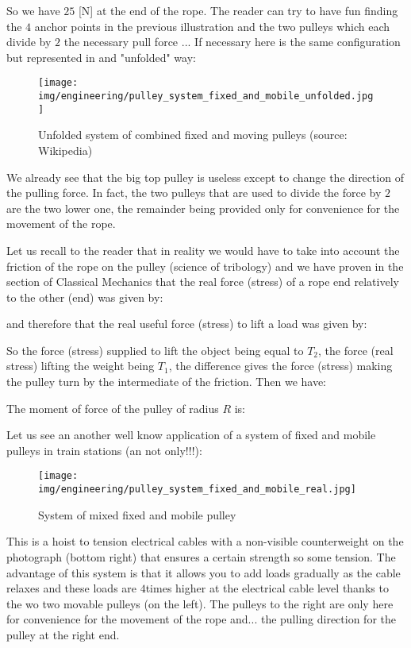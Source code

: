 	So we have $25$ [N] at the end of the rope. The reader can try to have fun finding the $4$ anchor points in the previous illustration and the two pulleys which each divide by $2$ the necessary pull force ... If necessary here is the same configuration but represented in and "unfolded" way:
	\begin{figure}[H]
		\centering
		\texttt{[image: img/engineering/pulley\_system\_fixed\_and\_mobile\_unfolded.jpg]}
		\caption{Unfolded system of combined fixed and moving pulleys (source: Wikipedia)}
	\end{figure}
	We already see that the big top pulley is useless except to change the direction of the pulling force. In fact, the two pulleys that are used to divide the force by $2$ are the two lower one, the remainder being provided only for convenience for the movement of the rope.
	
	Let us recall to the reader that in reality we would have to take into account the friction of the rope on the pulley (science of tribology) and we have proven in the section of Classical Mechanics that the real force (stress) of a rope end relatively to the other (end) was given by:
	
	and therefore that the real useful force (stress) to lift a load was given by:
	
	So the force (stress) supplied to lift the object being equal to $T_2$, the force (real stress) lifting the weight being $T_1$, the difference gives the force (stress) making the pulley turn by the intermediate of the friction. Then we have:
	
	The moment of force of the pulley of radius $R$ is:
	
	Let us see an another well know application of a system of fixed and mobile pulleys in train stations (an not only!!!):
	\begin{figure}[H]
		\centering
		\texttt{[image: img/engineering/pulley\_system\_fixed\_and\_mobile\_real.jpg]}
		\caption{System of mixed fixed and mobile pulley}
	\end{figure}
	This is a hoist to tension electrical cables with a non-visible counterweight on the photograph (bottom right) that ensures a certain strength so some tension. The advantage of this system is that it allows you to add loads gradually as the cable relaxes and these loads are $4$times higher at the electrical cable level thanks to the wo two movable pulleys (on the left). The pulleys to the right are only here for convenience for the movement of the rope and... the pulling direction for the pulley at the right end.
	
